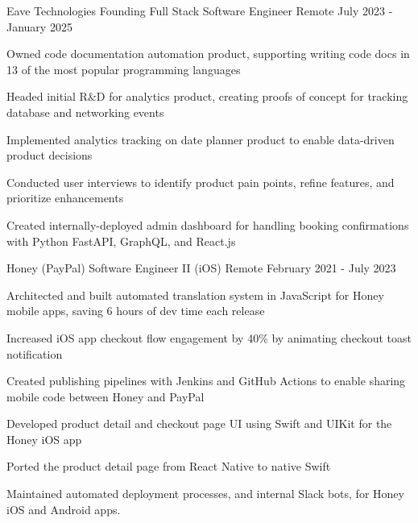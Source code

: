 \documentclass[11pt, a4paper]{awesome-cv}
\begin{document}
\makecvheader


\begin{cventries}


  \cventry
    {Eave Technologies}
    {Founding Full Stack Software Engineer}
    {Remote}
    {July 2023 - January 2025}
    {
      \begin{cvitems}
        \item{Owned code documentation automation product, supporting writing code docs in 13 of the most popular programming languages}
        \item{Headed initial R\&D for analytics product, creating proofs of concept for tracking database and networking events}
        \item{Implemented analytics tracking on date planner product to enable data-driven product decisions}
        \item{Conducted user interviews to identify product pain points, refine features, and prioritize enhancements}
        \item{Created internally-deployed admin dashboard for handling booking confirmations with Python FastAPI, GraphQL, and React.js}
      \end{cvitems}
    }

  \cventry
    {Honey (PayPal)}
    {Software Engineer II (iOS)}
    {Remote}
    {February 2021 - July 2023}
    {
        \begin{cvitems}
            \item {Architected and built automated translation system in JavaScript for Honey mobile apps, saving 6 hours of dev time each release}
            \item {Increased iOS app checkout flow engagement by 40\% by animating checkout toast notification}
            \item {Created publishing pipelines with Jenkins and GitHub Actions to enable sharing mobile code between Honey and PayPal}
            \item {Developed product detail and checkout page UI using Swift and UIKit for the Honey iOS app}
            \item {Ported the product detail page from React Native to native Swift}
            \item {Maintained automated deployment processes, and internal Slack bots, for Honey iOS and Android apps.}
        \end{cvitems}
    }


\end{cventries}
\end{document}
